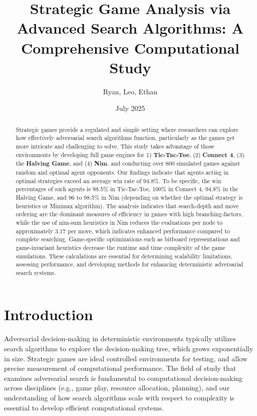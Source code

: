 \documentclass[12pt]{article}
\title{Strategic Game Analysis via Advanced Search Algorithms: A Comprehensive Computational Study}
\author{Ryan, Leo, Ethan}
\date{July 2025}
\begin{document}
\maketitle

\begin{abstract}
Strategic games provide a regulated and simple setting where researchers can explore how effectively adversarial search algorithms function, particularly as the games get more intricate and challenging to solve. This study takes advantage of those environments by developing full game engines for 1) \textbf{Tic-Tac-Toe}, (2) \textbf{Connect 4}, (3) the \textbf{Halving Game}, and (4) \textbf{Nim}, and conducting over 800 simulated games against random and optimal agent opponents. Our findings indicate that agents acting in optimal strategies exceed an average win rate of 94.8\%. To be specific, the win percentages of such agents is 98.5\% in Tic-Tac-Toe, 100\% in Connect 4, 94.8\% in the Halving Game, and 96 to 98.5\% in Nim (depending on whether the optimal strategy is \glspl{heuristic} or \gls{Minimax} algorithm). The analysis indicates that \gls{search-depth} and move ordering are the dominant measures of efficiency in games with high \glspl{branching-factor}, while the use of \gls{nim-sum} heuristics in Nim reduces the evaluations per node to approximately 3.17 per move, which indicates enhanced performance compared to complete searching. Game-specific optimizations such as \gls{bitboard} representations and game-invariant heuristics decrease the runtime and time complexity of the game simulations. These calculations are essential for determining scalability limitations, assessing performance, and developing methods for enhancing deterministic adversarial search systems.
\end{abstract}

\section{Introduction}

Adversarial decision-making in deterministic environments typically utilizes search algorithms to explore the decision-making tree, which grows exponentially in size. Strategic games are ideal controlled environments for testing, and allow precise measurement of computational performance. The field of study that examines adversarial search is fundamental to computational decision-making across disciplines (e.g., game play, resource allocation, planning), and our understanding of how search algorithms scale with respect to complexity is essential to develop efficient computational systems.
\end{document}
